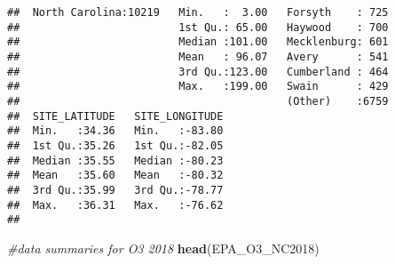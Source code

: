 \documentclass[]{article}
\newenvironment{Shaded}{\begin{snugshade}}{\end{snugshade}}
\newcommand{\KeywordTok}[1]{\textcolor[rgb]{0.13,0.29,0.53}{\textbf{#1}}}
\newcommand{\CommentTok}[1]{\textcolor[rgb]{0.56,0.35,0.01}{\textit{#1}}}
\newcommand{\NormalTok}[1]{#1}
\begin{document}
\begin{verbatim}
##  North Carolina:10219   Min.   :  3.00   Forsyth    : 725  
##                         1st Qu.: 65.00   Haywood    : 700  
##                         Median :101.00   Mecklenburg: 601  
##                         Mean   : 96.07   Avery      : 541  
##                         3rd Qu.:123.00   Cumberland : 464  
##                         Max.   :199.00   Swain      : 429  
##                                          (Other)    :6759  
##  SITE_LATITUDE   SITE_LONGITUDE  
##  Min.   :34.36   Min.   :-83.80  
##  1st Qu.:35.26   1st Qu.:-82.05  
##  Median :35.55   Median :-80.23  
##  Mean   :35.60   Mean   :-80.32  
##  3rd Qu.:35.99   3rd Qu.:-78.77  
##  Max.   :36.31   Max.   :-76.62  
## 
\end{verbatim}

\begin{Shaded}
\begin{Highlighting}[]
\CommentTok{#data summaries for O3 2018}
\KeywordTok{head}\NormalTok{(EPA_O3_NC2018)}
\end{Highlighting}
\end{Shaded}
\end{document}
